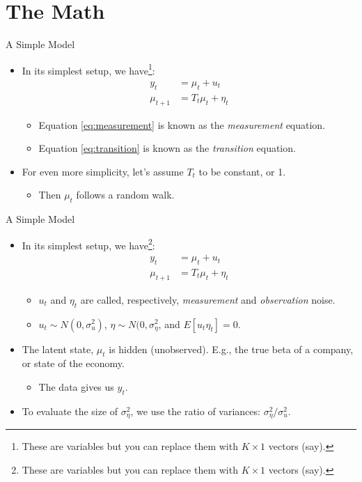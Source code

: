 \documentclass[dvipsnames,mathserif]{beamer}
\begin{document}
{\section{The Math}

\begin{frame}{A Simple Model}
	\begin{itemize}
		\item In its simplest setup, we have\footnote{\tiny These are variables but you can replace them with $K \times 1$ vectors (say).}:
		\begin{align}
			y_t 		&= \mu_t + u_t	\label{eq:measurement} \\ 
			\mu_{t+1}	&= T_t \mu_t + \eta_t \label{eq:transition}
		\end{align}
		\begin{itemize}
			\item Equation \eqref{eq:measurement} is known as the \textit{measurement} equation. 
			\item Equation \eqref{eq:transition} is known as the \textit{transition} equation.
		\end{itemize}
		\item For even more simplicity, let's assume $T_t$ to be constant, or 1.		
		\begin{itemize}
			\item Then $\mu_t$ follows a random walk.
		\end{itemize}
	\end{itemize}
\end{frame}

\begin{frame}{A Simple Model}
	\begin{itemize}
		\item In its simplest setup, we have\footnote{\tiny These are variables but you can replace them with $K \times 1$ vectors (say).}:
		\begin{align}
			y_t 		&= \mu_t + u_t	\label{eq:measurement} \\ 
			\mu_{t+1}	&= T_t \mu_t + \eta_t \label{eq:transition}
		\end{align}
		\begin{itemize}
			\item $u_t$ and $\eta_t$ are called, respectively, \textit{measurement} and \textit{observation} noise.
			\item $u_t \sim N(0, \sigma_u^2)$, $\eta \sim N(0, \sigma_\eta^2$, and $E[u_t \eta_t] = 0$.
		\end{itemize}
		\item The latent state, $\mu_t$ is hidden (unobserved). E.g., the true beta of a company, or state of the economy. 
		\begin{itemize}
			\item The data gives us $y_t$. 
		\end{itemize}
		\pause
		\item To evaluate the size of $\sigma_\eta^2$, we use the ratio of variances: $\sigma_\eta^2 / \sigma_u^2$.
	\end{itemize}
\end{frame}

}
\end{document}
